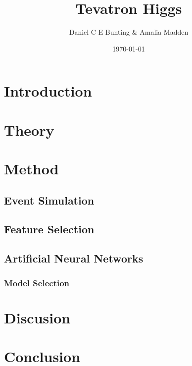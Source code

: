 \documentclass{article}
\title{Tevatron Higgs}
\author{ Daniel C E Bunting \& Amalia Madden}
\date{\today}
\begin{document}
\maketitle
\begin{abstract}
\end{abstract}

\section{Introduction} %
\label{sec:introduction}


\section{Theory} %
\label{sec:theory}





\section{Method} %
\label{sec:method}

\subsection{Event Simulation} %
\label{sub:event_simulation}


\subsection{Feature Selection} %
\label{sub:feature_selection}

\subsection{Artificial Neural Networks} %
\label{sub:artificial_neural_networks}


\subsubsection{Model Selection} %
\label{ssub:model_selection}




\section{Discusion} %
\label{sec:discusion}


\section{Conclusion} %
\label{sec:conclusion}






 

\clearpage
\end{document}
